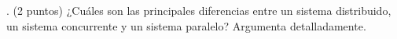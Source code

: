 . (2 puntos) ¿Cuáles son las principales diferencias entre
un sistema distribuido, un sistema concurrente y un sistema
paralelo? Argumenta detalladamente.

